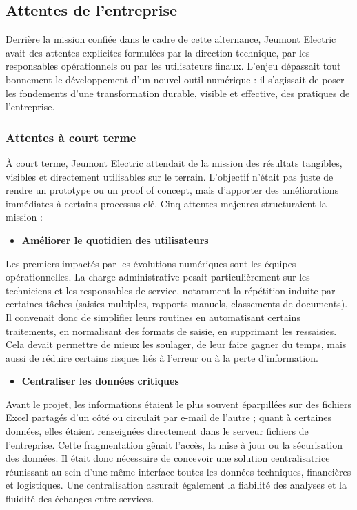 \documentclass[11pt,a4paper]{article}
\begin{document}
\subsection{Attentes de l’entreprise}
Derrière la mission confiée dans le cadre de cette alternance, Jeumont Electric avait des attentes explicites formulées par la direction technique, par les responsables opérationnels ou par les utilisateurs finaux. L’enjeu dépassait tout bonnement le développement d’un nouvel outil numérique : il s’agissait de poser les fondements d’une transformation durable, visible et effective, des pratiques de l’entreprise.

\subsubsection{Attentes à court terme}

À court terme, Jeumont Electric attendait de la mission des résultats tangibles, visibles et directement utilisables sur le terrain. L’objectif n’était pas juste de rendre un prototype ou un proof of concept, mais d’apporter des améliorations immédiates à certains processus clé. Cinq attentes majeures structuraient la mission :

\begin{itemize}
	\item \textbf{Améliorer le quotidien des utilisateurs  }
\end{itemize}
Les premiers impactés par les évolutions numériques sont les équipes opérationnelles. La charge administrative pesait particulièrement sur les techniciens et les responsables de service, notamment la répétition induite par certaines tâches (saisies multiples, rapports manuels, classements de documents). Il convenait donc de simplifier leurs routines en automatisant certains traitements, en normalisant des formats de saisie, en supprimant les ressaisies. Cela devait permettre de mieux les soulager, de leur faire gagner du temps, mais aussi de réduire certains risques liés à l’erreur ou à la perte d’information.

\begin{itemize}
\item \textbf{Centraliser les données critiques  } \
\end{itemize}

Avant le projet, les informations étaient le plus souvent éparpillées sur des fichiers Excel partagés d’un côté ou circulait par e-mail de l’autre ; quant à certaines données, elles étaient renseignées directement dans le serveur fichiers de l’entreprise. Cette fragmentation gênait l’accès, la mise à jour ou la sécurisation des données. Il était donc nécessaire de concevoir une solution centralisatrice réunissant au sein d’une même interface toutes les données techniques, financières et logistiques. Une centralisation assurait également la fiabilité des analyses et la fluidité des échanges entre services.
\end{document}
